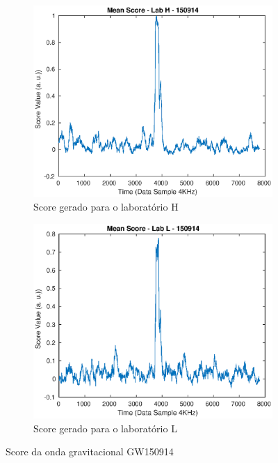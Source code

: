 \begin{figure}[H]
     \centering
     \begin{subfigure}[b]{0.45\textwidth}
         \centering
         \includegraphics[width=\textwidth]{figuras/GW150914_LabH.eps}
         \caption{Score gerado para o laboratório H}
         \label{fig:score-H1}
     \end{subfigure}
     \hfill
     \begin{subfigure}[b]{0.45\textwidth}
         \centering
         \includegraphics[width=\textwidth]{figuras/GW150914_LabL.eps}
         \caption{Score gerado para o laboratório L}
         \label{fig:score-L1}
     \end{subfigure}
     \caption{Score da onda gravitacional GW150914}
\end{figure}

